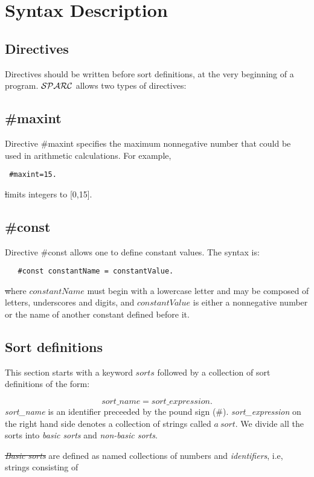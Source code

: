 \documentclass[12pt, letterpaper]{article}
\begin{document}
\section{Syntax Description}

\subsection{Directives}
Directives should be written before sort definitions, at the very beginning of a program.
${\cal SPARC}$ allows two types of directives:
\subsection*{\#maxint}
Directive \#maxint specifies the maximum nonnegative number that could be used in arithmetic calculations. For example,
\begin{verbatim}
 #maxint=15.
\end{verbatim}
\st limits integers to [0,15].
\subsection*{\#const}
Directive \#const allows one to define constant values. The syntax is:

\begin{verbatim}
   #const constantName = constantValue.
\end{verbatim}      
\st where $constantName$  must begin with a lowercase letter and may be composed of letters, underscores and digits,
 and $constantValue$ is either a nonnegative number or the name of another constant defined before it.  

  

\subsection{Sort definitions}\label{ss}


This section starts with a keyword $sorts$ followed by a collection of sort definitions of the form:


\begin{equation*}
  sort\_name=sort\_expression.
\end{equation*}
\textit{sort\_name} is an identifier preceeded by the pound sign (\#).
\textit{sort\_expression}  on the right hand side denotes a collection of strings called  $a~sort$. We divide all the sorts into \textit{basic sorts} and \textit{non-basic sorts}. 

\st \textit{Basic sorts} are defined as named collections of numbers and \textit{identifiers}, i.e, strings consisting of
\end{document}
